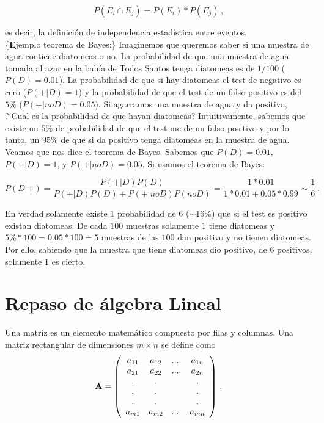 \documentclass[
]{agujournal2019}
\begin{document}
\[P(E_i\cap E_j)=P(E_i)*P(E_j)\,,\]

es decir, la definición de independencia estadística entre eventos.\\

\{\textbf Ejemplo teorema de Bayes:\} Imaginemos que queremos saber si
una muestra de agua contiene diatomeas o no. La probabilidad de que una
muestra de agua tomada al azar en la bahía de Todos Santos tenga
diatomeas es de \(1/100\) (\(P(D)=0.01\)). La probabilidad de que si hay
diatomeas el test de negativo es cero (\(P(+|D)=1\)) y la probabilidad
de que el test de un falso positivo es del \(5\%\) (\(P(+|noD)=0.05\)).
Si agarramos una muestra de agua y da positivo, ?{}`Cual es la
probabilidad de que hayan diatomeas? Intuitivamente, sabemos que existe
un \(5\%\) de probabilidad de que el test me de un falso positivo y por
lo tanto, un \(95\%\) de que si da positivo tenga diatomeas en la
muestra de agua. Veamos que nos dice el teorema de Bayes. Sabemos que
\(P(D)=0.01\), \(P(+|D)=1\), y \(P(+|noD)=0.05\). Si usamos el teorema
de Bayes:

\[ P(D|+)=\frac{P(+|D)P(D)}{P(+|D)P(D) + P(+|noD)P(noD)}=
          \frac{1*0.01}{1*0.01+0.05*0.99}\sim\frac{1}{6}\,.\]

En verdad solamente existe \(1\) probabilidad de \(6\) (\(\sim16\%\))
que si el test es positivo existan diatomeas. De cada \(100\) muestras
solamente \(1\) tiene diatomeas y \(5\%*100=0.05*100=5\) muestras de las
\(100\) dan positivo y no tienen diatomeas. Por ello, sabiendo que la
muestra que tiene diatomeas dio positivo, de \(6\) positivos, solamente
\(1\) es cierto.




\hypertarget{repaso-de-uxe1lgebra-lineal}{%
\section{Repaso de álgebra Lineal}\label{repaso-de-uxe1lgebra-lineal}}

Una matriz es un elemento matemático compuesto por filas y columnas. Una
matriz rectangular de dimensiones \(m\times n\) se define como
\[{\textbf A}=\left(\begin{array}{cccc}
  a_{11} & a_{12} & .... & a_{1n}\\
  a_{21} & a_{22} & .... & a_{2n}\\
    .    &   .    &      &   . \\
    .    &   .    &      &   . \\
    .    &   .    &      &   . \\
  a_{m1} & a_{m2} & .... & a_{mn}\\
\end{array}
  \right)
\,.\]
\end{document}
